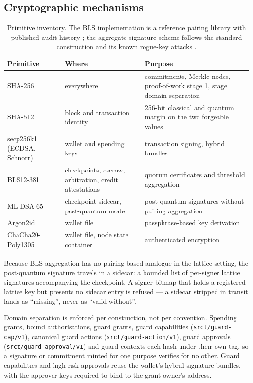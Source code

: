 \documentclass{article}
\begin{document}
\subsection{Cryptographic mechanisms}

\begin{table}[htbp]
\centering
\begin{tabular}{@{}p{}p{}p{}@{}}
\toprule
\textbf{Primitive} & \textbf{Where} & \textbf{Purpose} \\
\midrule
SHA-256 & everywhere & commitments, Merkle nodes, proof-of-work stage 1, stage
  domain separation \\
SHA-512 & block and transaction identity & 256-bit classical and quantum
  margin on the two forgeable values \\
secp256k1 (ECDSA, Schnorr) & wallet and spending keys & transaction signing,
  hybrid bundles \\
BLS12-381 & checkpoints, escrow, arbitration, credit attestations & quorum
  certificates and threshold aggregation \\
ML-DSA-65 & checkpoint sidecar, post-quantum mode & post-quantum signatures
  without pairing aggregation \\
Argon2id & wallet file & passphrase-based key derivation \\
ChaCha20-Poly1305 & wallet file, node state container & authenticated
  encryption \\
\bottomrule
\end{tabular}
\caption{Primitive inventory. The BLS implementation is a reference pairing
library with published audit history \cite{supranational-blst}; the aggregate
signature scheme follows the standard construction and its known rogue-key
attacks \cite{boneh2003aggregate,boneh2018multisignatures}.}
\label{tab:crypto}
\end{table}

Because BLS aggregation has no pairing-based analogue in the lattice setting,
the post-quantum signature travels in a sidecar: a bounded list of per-signer
lattice signatures accompanying the checkpoint. A signer bitmap that holds a
registered lattice key but presents no sidecar entry is refused --- a sidecar
stripped in transit lands as ``missing'', never as ``valid without''.

Domain separation is enforced per construction, not per convention. Spending
grants, bound authorisations, guard grants, guard capabilities
(\texttt{srct/guard-cap/v1}), canonical guard actions
(\texttt{srct/guard-action/v1}), guard approvals
(\texttt{srct/guard-approval/v1}) and guard contexts each hash under their own
tag, so a signature or commitment minted for one purpose verifies for no
other. Guard capabilities and high-risk approvals reuse the wallet's hybrid
signature bundles, with the approver keys required to bind to the grant
owner's address.
\end{document}

